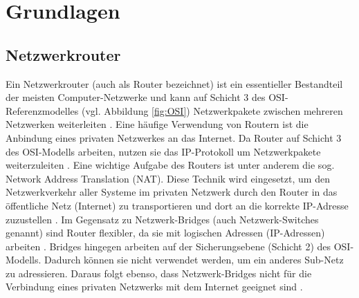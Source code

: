 \documentclass[a4paper]{book}
\begin{document}
\begin{large}
\begin{onehalfspace}
\end{onehalfspace}



\chapter{Grundlagen}


\section{Netzwerkrouter}
\label{Router}
\begin{onehalfspace}

Ein Netzwerkrouter (auch als Router bezeichnet) ist ein essentieller Bestandteil der meisten Computer-Netzwerke und kann auf Schicht 3 des OSI-Referenzmodelles (vgl. Abbildung \ref{fig:OSI}) Netzwerkpakete zwischen mehreren Netzwerken weiterleiten \cite[p.~48]{Lowe.2018}. Eine häufige Verwendung von Routern ist die Anbindung eines privaten Netzwerkes an das Internet. Da Router auf Schicht 3 des OSI-Modells arbeiten, nutzen sie das IP-Protokoll um Netzwerkpakete weiterzuleiten \cite[p.~48]{Lowe.2018}. Eine wichtige Aufgabe des Routers ist unter anderem die sog. \glqq Network Address Translation (NAT)\grqq . Diese Technik wird eingesetzt, um den Netzwerkverkehr aller Systeme im privaten Netzwerk durch den Router in das öffentliche Netz (Internet) zu transportieren und dort an die korrekte IP-Adresse zuzustellen \cite{Perlman.1999}. Im Gegensatz zu Netzwerk-Bridges (auch \glqq Netzwerk-Switches\grqq{} genannt) sind Router flexibler, da sie mit logischen Adressen (IP-Adressen) arbeiten \cite[p.~714]{Fischer.2011}. Bridges hingegen arbeiten auf der Sicherungsebene (Schicht 2) des OSI-Modells. Dadurch können sie nicht verwendet werden, um ein anderes Sub-Netz zu adressieren. Daraus folgt ebenso, dass Netzwerk-Bridges nicht für die Verbindung eines privaten Netzwerks mit dem Internet geeignet sind \cite[p.~48]{Lowe.2018}. \\

\end{onehalfspace}
\end{large}
\end{document}
